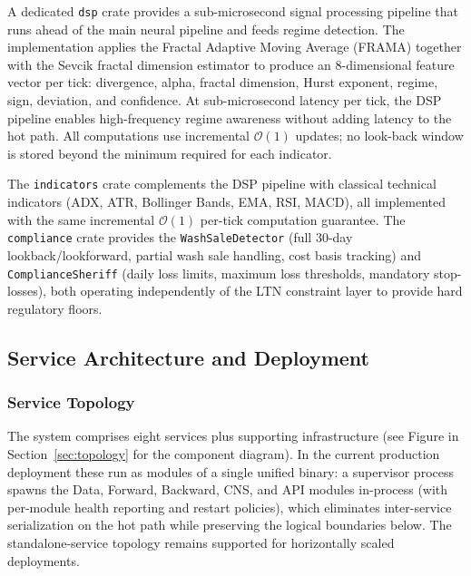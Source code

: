 \documentclass[12pt, a4paper]{article}
\begin{document}
A dedicated \texttt{dsp} crate provides a sub-microsecond signal processing pipeline that runs ahead of the main neural pipeline and feeds regime detection. The implementation applies the Fractal Adaptive Moving Average (FRAMA) together with the Sevcik fractal dimension estimator to produce an 8-dimensional feature vector per tick: divergence, alpha, fractal dimension, Hurst exponent, regime, sign, deviation, and confidence. At sub-microsecond latency per tick, the DSP pipeline enables high-frequency regime awareness without adding latency to the hot path. All computations use incremental $\mathcal{O}(1)$ updates; no look-back window is stored beyond the minimum required for each indicator.

The \texttt{indicators} crate complements the DSP pipeline with classical technical indicators (ADX, ATR, Bollinger Bands, EMA, RSI, MACD), all implemented with the same incremental $\mathcal{O}(1)$ per-tick computation guarantee. The \texttt{compliance} crate provides the \texttt{WashSaleDetector} (full 30-day lookback/lookforward, partial wash sale handling, cost basis tracking) and \texttt{ComplianceSheriff} (daily loss limits, maximum loss thresholds, mandatory stop-losses), both operating independently of the LTN constraint layer to provide hard regulatory floors.

\subsection{Service Architecture and Deployment}
\label{sec:deployment}

\subsubsection{Service Topology}

The system comprises eight services plus supporting infrastructure (see Figure in Section~\ref{sec:topology} for the component diagram). In the current production deployment these run as modules of a single unified binary: a supervisor process spawns the Data, Forward, Backward, CNS, and API modules in-process (with per-module health reporting and restart policies), which eliminates inter-service serialization on the hot path while preserving the logical boundaries below. The standalone-service topology remains supported for horizontally scaled deployments.
\end{document}
